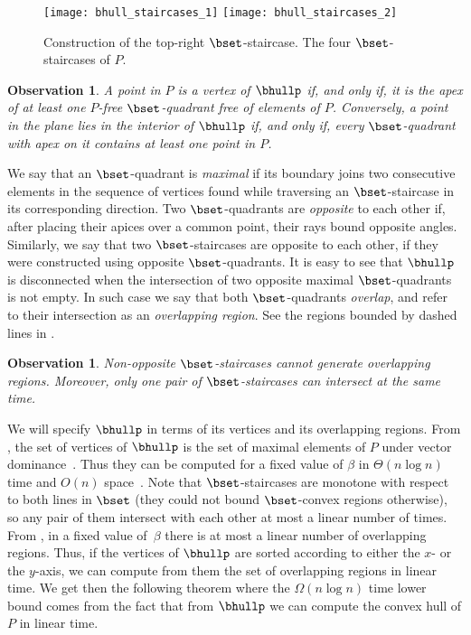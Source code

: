 \documentclass[11pt,letterpaper,english]{article}
\newtheorem{obs}[theorem]{Observation}
\theoremstyle{definition}
\begin{document}
\begin{figure}[ht]
  \centering
  \subcaptionbox{\label{bhull:fig:staircases:1}}
  {\texttt{[image: bhull\_staircases\_1]}}
  \hspace{1.5cm}
  \subcaptionbox{\label{bhull:fig:staircases:2}}
  {\texttt{[image: bhull\_staircases\_2]}}
  \caption{ Construction of the
    top-right $\bset$-staircase.  The
    four $\bset$-staircases of $P$.}
  \label{bhull:fig:staircases}
\end{figure}

\begin{obs}\label{bhull:obs:maximal}
  A point in $P$ is a vertex of $\bhullp$ if, and only if, it is the
  apex of at least one $P$-free $\bset$-quadrant free of elements of
  $P$. Conversely, a point in the plane lies in the interior of
  $\bhullp$ if, and only if, every $\bset$-quadrant with apex on it
  contains at least one point in $P$.
\end{obs}

We say that an $\bset$-quadrant is \emph{maximal} if its boundary
joins two consecutive elements in the sequence of vertices found
while traversing an $\bset$-staircase in its corresponding
direction. Two $\bset$-quadrants are \emph{opposite} to each other if,
after placing their apices over a common point, their rays bound
opposite angles. Similarly, we say that two $\bset$-staircases are
opposite to each other, if they were constructed using opposite
$\bset$-quadrants. It is easy to see that $\bhullp$ is disconnected
when the intersection of two opposite maximal $\bset$-quadrants is not
empty. In such case we say that both $\bset$-quadrants \emph{overlap},
and refer to their intersection as an \emph{overlapping region}. See
the regions bounded by dashed lines in
.

\begin{obs}\label{bhull:obs:staircases}
  Non-opposite $\bset$-staircases cannot generate overlapping
  regions. Moreover, only one pair of $\bset$-staircases can intersect
  at the same time.
\end{obs}

We will specify $\bhullp$ in terms of its vertices and its overlapping
regions. From , the set of vertices of
$\bhullp$ is the set of maximal elements of $P$ under vector
dominance~\cite{theta-maxima_1999}. Thus they can be computed for a
fixed value of $\beta$ in $\Theta(n \log n)$ time and $O(n)$
space~\cite{kung_1975,preparata_1985}. Note that $\bset$-staircases
are monotone with respect to both lines in $\bset$ (they could not
bound $\bset$-convex regions otherwise), so any pair of them intersect
with each other at most a linear number of times. From
, in a fixed value of~$\beta$ there is at
most a linear number of overlapping regions. Thus, if the vertices of
$\bhullp$ are sorted according to either the $x$- or the $y$-axis, we
can compute from them the set of overlapping regions in linear
time. We get then the following theorem where the $\Omega(n\log n)$
time lower bound comes from the fact that from $\bhullp$ we can compute
the convex hull of $P$ in linear time.
\end{document}
